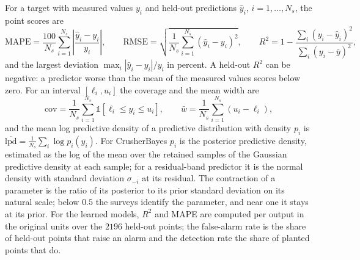 For a target with measured values $y_i$ and held-out predictions $\hat y_i$, $i=1,\dots,N_s$, the point scores are
\begin{equation}
\mathrm{MAPE} = \frac{100}{N_s}\sum_{i=1}^{N_s}\left|\frac{\hat y_i - y_i}{y_i}\right|,\qquad
\mathrm{RMSE} = \sqrt{\frac{1}{N_s}\sum_{i=1}^{N_s}\left(\hat y_i - y_i\right)^2},\qquad
R^2 = 1 - \frac{\sum_i(y_i-\hat y_i)^2}{\sum_i(y_i-\bar y)^2},
\label{eq:scores}
\end{equation}
and the largest deviation $\max_i|\hat y_i-y_i|/y_i$ in percent. A held-out $R^2$ can be negative: a predictor worse than the mean of the
measured values scores below zero. For an interval $[\ell_i,u_i]$ the coverage and the mean width are
\begin{equation}
\mathrm{cov} = \frac{1}{N_s}\sum_{i=1}^{N_s}\mathbb 1\!\left[\ell_i\le y_i\le u_i\right],\qquad
\bar w = \frac{1}{N_s}\sum_{i=1}^{N_s}(u_i-\ell_i),
\label{eq:coverage}
\end{equation}
and the mean log predictive density of a predictive distribution with density $p_i$ is $\overline{\mathrm{lpd}}=\frac{1}{N_s}\sum_i\log p_i(y_i)$.
For CrusherBayes $p_i$ is the posterior predictive density, estimated as the log of the mean over the retained samples of the Gaussian
predictive density at each sample; for a residual-band predictor it is the normal density with standard deviation $\sigma_{-i}$ at its
residual. The contraction of a parameter is the ratio of its posterior to its prior standard deviation on its natural scale; below $0.5$ the
surveys identify the parameter, and near one it stays at its prior. For the learned models, $R^2$ and MAPE are computed per output in the
original units over the $2196$ held-out points; the false-alarm rate is the share of held-out points that raise an alarm and the detection
rate the share of planted points that do.

